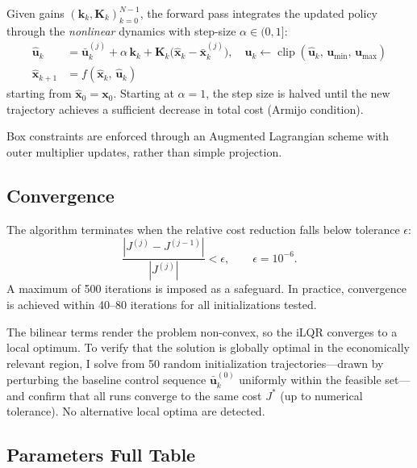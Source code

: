 \documentclass[12pt, a4paper]{article}
\begin{document}
Given gains $(\bm{k}_k, \bm{K}_k)_{k=0}^{N-1}$, the forward pass integrates the
updated policy through the \emph{nonlinear} dynamics with step-size
$\alpha \in (0, 1]$:
%
\begin{align}
    \hat{\bm{u}}_k   &= \bar{\bm{u}}_k^{(j)}
        + \alpha\,\bm{k}_k
        + \bm{K}_k\bigl(\hat{\bm{x}}_k - \bar{\bm{x}}_k^{(j)}\bigr),
    \quad \hat{\bm{u}}_k \leftarrow
        \operatorname{clip}\!\left(\hat{\bm{u}}_k,\, \bm{u}_{\min},\,
        \bm{u}_{\max}\right)
    \label{eq:fwd_u_app} \\[4pt]
    \hat{\bm{x}}_{k+1} &= f\!\left(\hat{\bm{x}}_k,\, \hat{\bm{u}}_k\right)
    \label{eq:fwd_x_app}
\end{align}
%
starting from $\hat{\bm{x}}_0 = \bm{x}_0$. Starting at $\alpha = 1$, the step size
is halved until the new trajectory achieves a sufficient decrease in total cost
(Armijo condition).

Box constraints are enforced through an Augmented Lagrangian scheme \citep{toussaint2014} with outer multiplier updates, rather than simple projection.


\subsection{Convergence}
\label{app:convergence}

The algorithm terminates when the relative cost reduction falls below tolerance
$\epsilon$:
%
\begin{equation}
    \frac{|J^{(j)} - J^{(j-1)}|}{|J^{(j)}|} < \epsilon, \qquad \epsilon = 10^{-6}.
\end{equation}
%
A maximum of 500 iterations is imposed as a safeguard. In practice, convergence
is achieved within 40--80 iterations for all initializations tested.

The bilinear terms render the problem non-convex, so the iLQR converges to a
local optimum. To verify that the solution is globally optimal in the
economically relevant region, I solve from 50 random initialization
trajectories---drawn by perturbing the baseline control sequence
$\bar{\bm{u}}_k^{(0)}$ uniformly within the feasible set---and confirm that all
runs converge to the same cost $J^*$ (up to numerical tolerance). No alternative
local optima are detected.

\subsection{Parameters Full Table}
\label{subsec:full_parameter}
\end{document}
